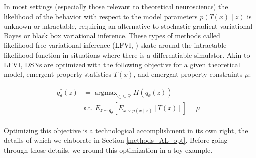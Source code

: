 \documentclass[11pt]{article}
\DeclareMathOperator*{\argmax}{argmax}
\begin{document}
In most settings (especially those relevant to theoretical neuroscience) the likelihood of the behavior with respect to the model parameters $p(T(x) \mid z)$ is unknown or intractable, requiring an alternative to stochastic gradient variational Bayes \cite{kingma2013auto} or black box variational inference\cite{ranganath2014black}.  These types of methods called likelihood-free variational inference (LFVI, \cite{tran2017hierarchical}) skate around the intractable likelihood function in situations where there is a differentiable simulator. Akin to LFVI, DSNs are optimized with the following objective for a given theoretical model, emergent property statistics $T(x)$, and emergent property constraints $\mu$:

\begin{equation} \label{eq:EP}
\begin{split}
q_\theta^*(z) &= \argmax_{q_\theta \in Q} H(q_\theta(z)) \\
 &  \text{s.t.  } E_{z \sim q_\theta}\left[ E_{x\sim p(x \mid z)}\left[T(x)\right] \right] = \mu \\
 \end{split}
\end{equation} 

Optimizing this objective is a technological accomplishment in its own right, the details of which we elaborate in Section \ref{methods_AL_opt}.  Before going through those details, we ground this optimization in a toy example.
\end{document}
